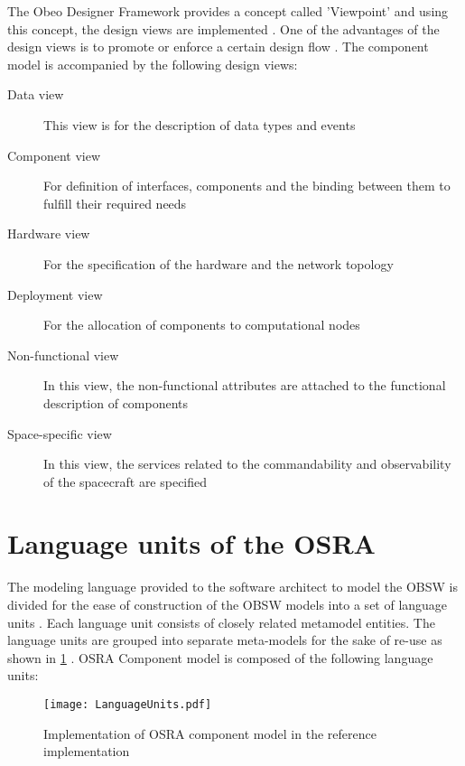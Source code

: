 The Obeo Designer Framework provides a concept called 'Viewpoint' and using this concept, the design views are implemented \cite{CompBasedProcess}. One of the advantages of the design views is to promote or enforce a certain design flow \cite{CompBasedProcess}. The component model is accompanied by the following design views:
\begin{description}
\item [Data view] This view is for the description of data types and events
\item [Component view] For definition of interfaces, components and the binding between them to fulfill their required needs
\item [Hardware view] For the specification of the hardware and the network topology
\item [Deployment view] For the allocation of components to computational nodes
\item [Non-functional view] In this view, the non-functional attributes are attached to the functional description of components
\item [Space-specific view] In this view, the services related to the commandability and observability of the spacecraft are specified
\end{description}  

\section{Language units of the OSRA}
\label{Language units}
The modeling language provided to the software architect to model the OBSW is divided for the ease of construction of the OBSW models into a set of language units \cite{SpecMetamodel}. Each language unit consists of closely related metamodel entities. The language units are grouped into separate meta-models for the sake of re-use as shown in \cref{fig: Language units} \cite{SpecMetamodel}. OSRA Component model is composed of the following language units:

\begin{figure}[h]
	\centering
	\texttt{[image: LanguageUnits.pdf]}
	\caption{Implementation of OSRA component model in the reference implementation}
	\label{fig: Language units}
\end{figure}


